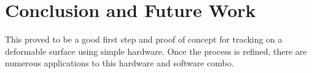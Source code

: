 \section{Conclusion and Future Work}

This proved to be a good first step and proof of concept for tracking on a deformable surface using simple hardware. Once the process is refined, there are numerous applications to this hardware and software combo. 
